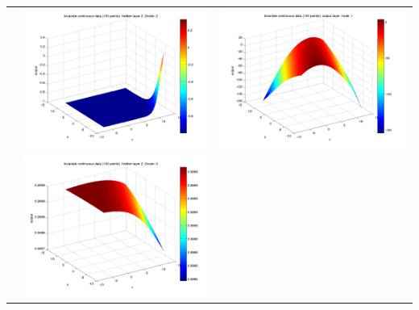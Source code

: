 \documentclass[fleqn]{article}
\begin{document}
\begin{center}
\begin{longtable}{ c | c | r }
     																		&   \includegraphics[scale=0.25]{./pics/bivariate100/_2_4/_2_4_epoch_100_hidden layer 2 :22}  & \includegraphics[scale=0.25]{./pics/bivariate100/_2_4/_2_4_epoch_100_output layer :1}  \\ 
     																		&   \includegraphics[scale=0.25]{./pics/bivariate100/_2_4/_2_4_epoch_100_hidden layer 2 :23} &  \\

\end{longtable}
\end{center}
\end{document}
